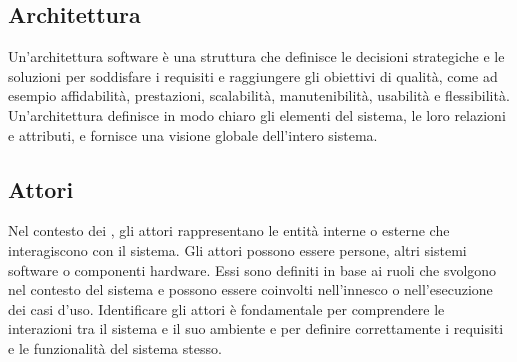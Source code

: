 \vspace{2em}
\subsection*{Architettura}
\par Un'architettura software è una struttura che definisce le decisioni strategiche e le soluzioni per soddisfare i requisiti e raggiungere gli obiettivi di qualità, come ad esempio affidabilità, prestazioni, scalabilità, manutenibilità, usabilità e flessibilità. Un'architettura definisce in modo chiaro gli elementi del sistema, le loro relazioni e attributi, e fornisce una visione globale dell'intero sistema.

\vspace{2em}
\subsection*{Attori}
\par Nel contesto dei , gli attori rappresentano le entità interne o esterne che interagiscono con il sistema. Gli attori possono essere persone, altri sistemi software o componenti hardware. Essi sono definiti in base ai ruoli che svolgono nel contesto del sistema e possono essere coinvolti nell'innesco o nell'esecuzione dei casi d'uso. Identificare gli attori è fondamentale per comprendere le interazioni tra il sistema e il suo ambiente e per definire correttamente i requisiti e le funzionalità del sistema stesso.
